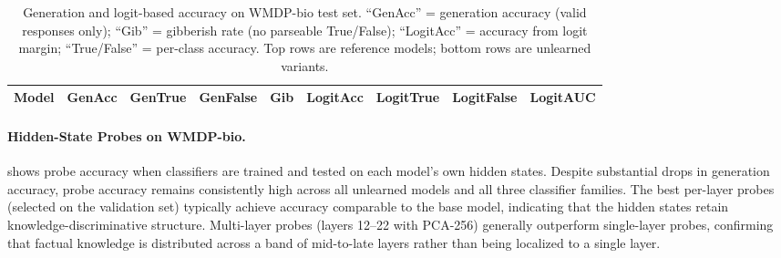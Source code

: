 \begin{table}[H]
\centering
\caption{Generation and logit-based accuracy on WMDP-bio test set.
``GenAcc'' = generation accuracy (valid responses only);
``Gib'' = gibberish rate (no parseable True/False);
``LogitAcc'' = accuracy from logit margin; ``True/False'' = per-class accuracy.
Top rows are reference models; bottom rows are unlearned variants.}
\label{tab:gen-logit}
\setlength{\tabcolsep}{5pt}
\small
\begin{tabular}{lcccccccc}
\toprule
\textbf{Model} & \textbf{GenAcc} & \textbf{GenTrue} & \textbf{GenFalse} & \textbf{Gib} & \textbf{LogitAcc} & \textbf{LogitTrue} & \textbf{LogitFalse} & \textbf{LogitAUC} \\
\midrule

\bottomrule
\end{tabular}
\end{table}

\paragraph{Hidden-State Probes on WMDP-bio.}

 shows probe accuracy when classifiers are trained and tested on
each model's own hidden states.
Despite substantial drops in generation accuracy, probe accuracy remains consistently
high across all unlearned models and all three classifier families.
The best per-layer probes (selected on the validation set) typically achieve accuracy
comparable to the base model, indicating that the hidden states retain
knowledge-discriminative structure.
Multi-layer probes (layers 12--22 with PCA-256) generally outperform single-layer
probes, confirming that factual knowledge is distributed across a band of mid-to-late
layers rather than being localized to a single layer.

